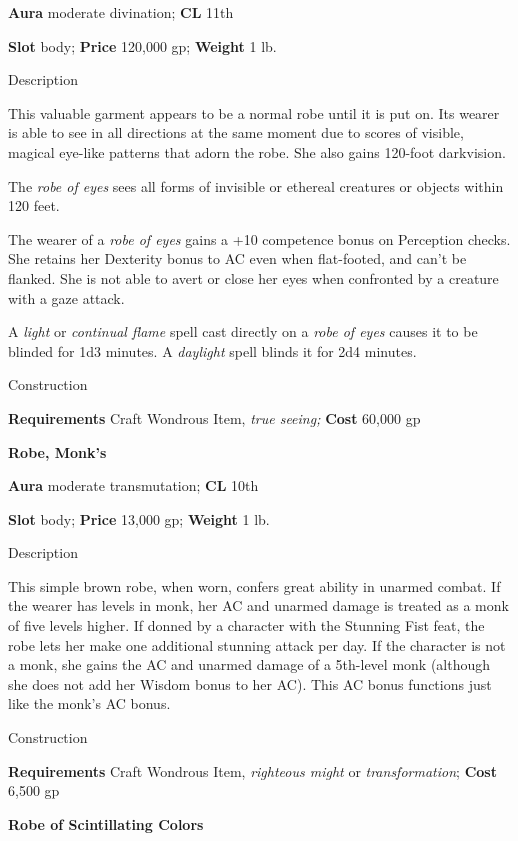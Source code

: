 \textbf{Aura} moderate divination;\textbf{ CL }11th
				
\textbf{Slot} body; \textbf{Price} 120,000 gp; \textbf{Weight} 1 lb.
				
Description
				
This valuable garment appears to be a normal robe until it is put on. Its wearer is able to see in all directions at the same moment due to scores of visible, magical eye-like patterns that adorn the robe. She also gains 120-foot darkvision.
				
The \textit{robe of eyes} sees all forms of invisible or ethereal creatures or objects within 120 feet.
				
The wearer of a \textit{robe of eyes} gains a +10 competence bonus on Perception checks. She retains her Dexterity bonus to AC even when flat-footed, and can't be flanked. She is not able to avert or close her eyes when confronted by a creature with a gaze attack.
				
A \textit{light} or \textit{continual flame} spell cast directly on a \textit{robe of eyes} causes it to be blinded for 1d3 minutes. A \textit{daylight} spell blinds it for 2d4 minutes. 
				
Construction
				
\textbf{Requirements} Craft Wondrous Item,\textit{ true seeing;}\textbf{ Cost }60,000 gp
				
\textbf{Robe, Monk's}
				
\textbf{Aura} moderate transmutation; \textbf{CL} 10th
				
\textbf{Slot }body; \textbf{Price} 13,000 gp; \textbf{Weight} 1 lb.
				
Description
				
This simple brown robe, when worn, confers great ability in unarmed combat. If the wearer has levels in monk, her AC and unarmed damage is treated as a monk of five levels higher. If donned by a character with the Stunning Fist feat, the robe lets her make one additional stunning attack per day. If the character is not a monk, she gains the AC and unarmed damage of a 5th-level monk (although she does not add her Wisdom bonus to her AC). This AC bonus functions just like the monk's AC bonus.
				
Construction
				
\textbf{Requirements }Craft Wondrous Item, \textit{righteous might }or \textit{transformation}; \textbf{Cost} 6,500 gp
				
\textbf{Robe of Scintillating Colors}
				
